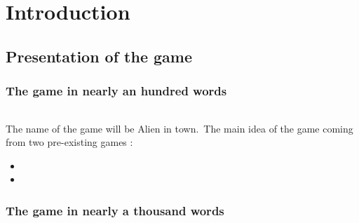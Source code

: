 \chapter*{Introduction}

\section{Presentation of the game}

\subsection{The game in nearly an hundred words}
\subparagraph{}
\textnormal{ The name of the game will be Alien in town.\
The main idea of the game coming from two pre-existing games :}
\begin{itemize}
\item {}
\item {}
\end{itemize}

\subsection{The game in nearly a thousand words}
\subparagraph{}

